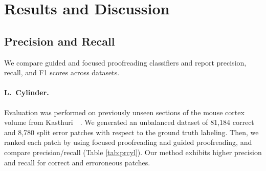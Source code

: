 \section{Results and Discussion}


\subsection{Precision and Recall}

We compare guided and focused proofreading classifiers and report precision, recall, and F1 scores across datasets.

\paragraph{L.~Cylinder.} Evaluation was performed on previously unseen sections of the mouse cortex volume from Kasthuri~\etal~\cite{kasthuri2015saturated}. We generated an unbalanced dataset of 81,184 correct and 8,780 split error patches with respect to the ground truth labeling. Then, we ranked each patch by using focused proofreading and guided proofreading, and compare precision/recall (Table \ref{tab:prcyl}). Our method exhibits higher precision and recall for correct and erroroneous patches.

\begin{table}[t]
\caption{Classifier comparison on an unbalanced test set of the L.~Cylinder volume.}%
\label{tab:prcyl}
\end{table}

